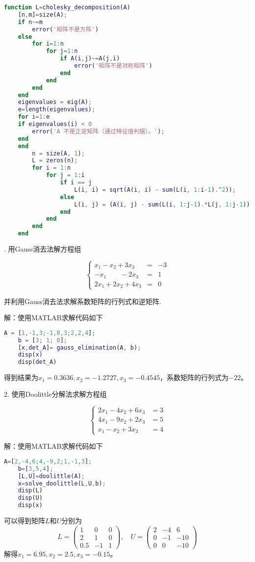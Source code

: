 \documentclass{ctexart}
\begin{document}
\begin{lstlisting}[caption=Cholesky分解函数, language=matlab]
    function L=cholesky_decomposition(A)
    [n,m]=size(A);
    if n~=m
        error('矩阵不是方阵')
    else
        for i=1:n
            for j=1:n
                if A(i,j)~=A(j,i)
                    error('矩阵不是对称矩阵')
                end
            end
        end
    end
    eigenvalues = eig(A);
    e=length(eigenvalues);
    for i=1:e
    if eigenvalues(i) < 0
        error('A 不是正定矩阵（通过特征值判据）。');
    end
    end
        n = size(A, 1);
        L = zeros(n);
        for i = 1:n
            for j = 1:i
                if i == j
                    L(i, i) = sqrt(A(i, i) - sum(L(i, 1:i-1).^2));
                else
                    L(i, j) = (A(i, j) - sum(L(i, 1:j-1).*L(j, 1:j-1))) / L(j, j);
                end
            end
        end
    end
\end{lstlisting}

. {\kaishu 用Gauss消去法解方程组}

\[
\left\{
\begin{array}{rcl}
x_{1} -x_{2} +3 x_{3} &=&-3 \\
-x_{1} \qquad -2 x_{3} &= &1 \\
2 x_{1} +2 x_{2} +4 x_{3} &=&0
\end{array}
\right.
\]

{\kaishu 并利用Gauss消去法求解系数矩阵的行列式和逆矩阵.}

解：使用MATLAB求解代码如下
\begin{lstlisting}[language=matlab]
    A = [1,-1,3;-1,0,3;2,2,4];
    b = [3; 1; 0];
    [x,det_A]= gauss_elimination(A, b);
    disp(x)
    disp(det_A)
\end{lstlisting}
得到结果为$x_1=0.3636,x_2=-1.2727,x_3=-0.4545$，系数矩阵的行列式为$-22$。

2. {\kaishu 使用Doolittle分解法求解方程组}

\[
\left\{
\begin{aligned}
2 x_{1} - 4 x_{2} + 6 x_{3} &= 3 \\
4 x_{1} - 9 x_{2} + 2 x_{3} &= 5 \\
x_{1} - x_{2} + 3 x_{3} &= 4
\end{aligned}
\right.
\]

解：使用MATLAB求解代码如下
\begin{lstlisting}[language=matlab]
    A=[2,-4,6;4,-9,2;1,-1,3];
    b=[3,5,4];
    [L,U]=doolittle(A);
    x=solve_doolittle(L,U,b);
    disp(L)
    disp(U)
    disp(x)    
\end{lstlisting}
可以得到矩阵$L$和$U$分别为
\[
L=\left(\begin{array}{ccc}
1 & 0 & 0 \\
2 & 1 & 0 \\
0.5 & -1 & 1
\end{array}\right), \quad U=\left(\begin{array}{ccc}
2 & -4 & 6 \\
0 & -1 & -10 \\
0 & 0 & -10
\end{array}\right)
\]
解得$x_1=6.95,x_2=2.5,x_3=-0.15$。
\end{document}
